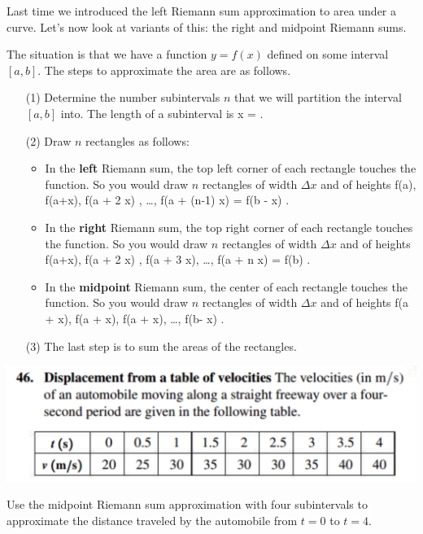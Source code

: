 \documentclass[11pt]{amsart}
\begin{document}
Last time we introduced the left Riemann sum approximation to area under a curve. 
Let's now look at variants of this: the right and midpoint Riemann sums. 

The situation is that we have a function $y=f(x)$ defined on some interval $[a,b]$. 
The steps to approximate the area are as follows. 
\begin{itemize}
\item[(1)] Determine the number subintervals $n$ that we will partition the interval $[a,b]$ into.
The length of a subinterval is 
\beqn
\Delta x =  .
\eeqn
\item[(2)]
Draw $n$ rectangles as follows:
\begin{itemize}
\item In the {\bf left} Riemann sum, the top left corner of each rectangle touches the function. 
So you would draw $n$ rectangles of width $\Delta x$ and of heights 
\beqn
f(a), f(a+\Delta x), f(a + 2 \Delta x) , \ldots, f(a + (n-1) \Delta x) = f(b - \Delta x) .
\eeqn
\item In the {\bf right} Riemann sum, the top right corner of each rectangle touches the function.
So you would draw $n$ rectangles of width $\Delta x$ and of heights 
\beqn
f(a+\Delta x), f(a + 2 \Delta x) , f(a + 3 \Delta x), \ldots, f(a + n \Delta x) = f(b) .
\eeqn
\item In the {\bf midpoint} Riemann sum, the center of each rectangle touches the function. 
So you would draw $n$ rectangles of width $\Delta x$ and of heights 
\beqn
f(a +  \Delta x), f(a +  \Delta x), f(a +  \Delta x), \ldots, f(b- \Delta x) .
\eeqn
\end{itemize} 
\item[(3)]
The last step is to sum the areas of the rectangles. 
\end{itemize}


\newpage

\begin{eg}\;

\begin{center}
\includegraphics[scale=.5]{velocity}
\end{center} 

Use the midpoint Riemann sum approximation with four subintervals to approximate the distance traveled by the automobile from $t=0$ to $t=4$. 
\end{eg}
\end{document}
